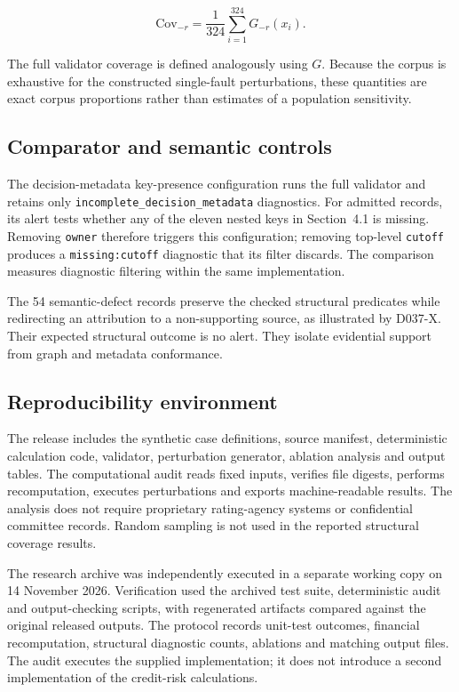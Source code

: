 \documentclass[11pt,a4paper]{article}
\begin{document}
\begin{equation}\label{eq:ablation}\mathrm{Cov}_{-r}=\frac{1}{324}\sum_{i=1}^{324}G_{-r}(x_i).\end{equation}

The full validator coverage is defined analogously using $G$. Because the corpus is exhaustive for the constructed single-fault perturbations, these quantities are exact corpus proportions rather than estimates of a population sensitivity.

\subsection{Comparator and semantic controls}

The decision-metadata key-presence configuration runs the full validator and retains only \nolinkurl{incomplete_decision_metadata} diagnostics. For admitted records, its alert tests whether any of the eleven nested keys in Section~4.1 is missing. Removing \nolinkurl{owner} therefore triggers this configuration; removing top-level \nolinkurl{cutoff} produces a \nolinkurl{missing:cutoff} diagnostic that its filter discards. The comparison measures diagnostic filtering within the same implementation.

The 54 semantic-defect records preserve the checked structural predicates while redirecting an attribution to a non-supporting source, as illustrated by D037-X. Their expected structural outcome is no alert. They isolate evidential support from graph and metadata conformance.

\subsection{Reproducibility environment}

The release includes the synthetic case definitions, source manifest, deterministic calculation code, validator, perturbation generator, ablation analysis and output tables. The computational audit reads fixed inputs, verifies file digests, performs recomputation, executes perturbations and exports machine-readable results. The analysis does not require proprietary rating-agency systems or confidential committee records. Random sampling is not used in the reported structural coverage results.

The research archive was independently executed in a separate working copy on 14 November 2026. Verification used the archived test suite, deterministic audit and output-checking scripts, with regenerated artifacts compared against the original released outputs. The protocol records unit-test outcomes, financial recomputation, structural diagnostic counts, ablations and matching output files. The audit executes the supplied implementation; it does not introduce a second implementation of the credit-risk calculations.
\end{document}
